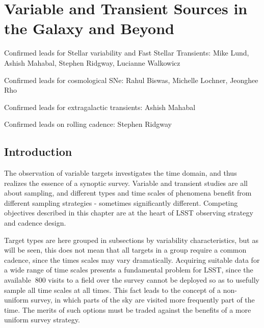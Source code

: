 
\chapter[Variables and Transients]{Variable and Transient Sources in the Galaxy and Beyond}
\label{chp:vartrans}




Confirmed leads for Stellar variability and Fast Stellar Transients:
Mike Lund, Ashish Mahabal, Stephen Ridgway, Lucianne Walkowicz

Confirmed leads for cosmological SNe: Rahul Biswas, Michelle Lochner,
Jeonghee Rho

Confirmed leads for extragalactic transients: Ashish Mahabal

Confirmed leads on rolling cadence: Stephen Ridgway


\section{Introduction}

The observation of variable targets investigates the time domain, and thus realizes the essence of a synoptic survey.  Variable and transient studies are all about sampling, and different types and time scales of phenomena benefit from different sampling strategies - sometimes significantly different.  Competing objectives described in this chapter are at the heart of LSST observing strategy and cadence design.

Target types are here grouped in subsections by variability characteristics, but as will be seen, this does not mean that all targets in a group require a common cadence, since the times scales may vary dramatically.  Acquiring suitable data for a wide range of time scales presents a fundamental problem for LSST, since the available $~$800 visits to a field over the survey cannot be deployed so as to usefully sample all time scales at all times.  This fact leads to the concept of a non-uniform survey, in which parts of the sky are visited more frequently part of the time.  The merits of such options must be traded against the benefits of a more uniform survey strategy.

